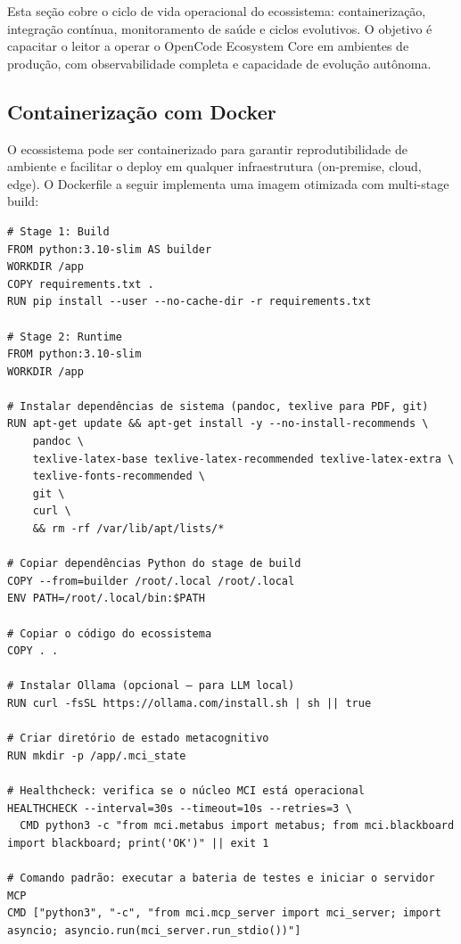 Esta seção cobre o ciclo de vida operacional do ecossistema: containerização, integração contínua, monitoramento de saúde e ciclos evolutivos. O objetivo é capacitar o leitor a operar o OpenCode Ecosystem Core em ambientes de produção, com observabilidade completa e capacidade de evolução autônoma.

\subsection{Containerização com Docker}
\label{sec:docker}

O ecossistema pode ser containerizado para garantir reprodutibilidade de ambiente e facilitar o deploy em qualquer infraestrutura (on-premise, cloud, edge). O Dockerfile a seguir implementa uma imagem otimizada com multi-stage build:

\begin{lstlisting}[language=docker,caption={Dockerfile para o OpenCode Ecosystem Core},label={lst:dockerfile}]
# Stage 1: Build
FROM python:3.10-slim AS builder
WORKDIR /app
COPY requirements.txt .
RUN pip install --user --no-cache-dir -r requirements.txt

# Stage 2: Runtime
FROM python:3.10-slim
WORKDIR /app

# Instalar dependências de sistema (pandoc, texlive para PDF, git)
RUN apt-get update && apt-get install -y --no-install-recommends \
    pandoc \
    texlive-latex-base texlive-latex-recommended texlive-latex-extra \
    texlive-fonts-recommended \
    git \
    curl \
    && rm -rf /var/lib/apt/lists/*

# Copiar dependências Python do stage de build
COPY --from=builder /root/.local /root/.local
ENV PATH=/root/.local/bin:$PATH

# Copiar o código do ecossistema
COPY . .

# Instalar Ollama (opcional — para LLM local)
RUN curl -fsSL https://ollama.com/install.sh | sh || true

# Criar diretório de estado metacognitivo
RUN mkdir -p /app/.mci_state

# Healthcheck: verifica se o núcleo MCI está operacional
HEALTHCHECK --interval=30s --timeout=10s --retries=3 \
  CMD python3 -c "from mci.metabus import metabus; from mci.blackboard import blackboard; print('OK')" || exit 1

# Comando padrão: executar a bateria de testes e iniciar o servidor MCP
CMD ["python3", "-c", "from mci.mcp_server import mci_server; import asyncio; asyncio.run(mci_server.run_stdio())"]
\end{lstlisting}

